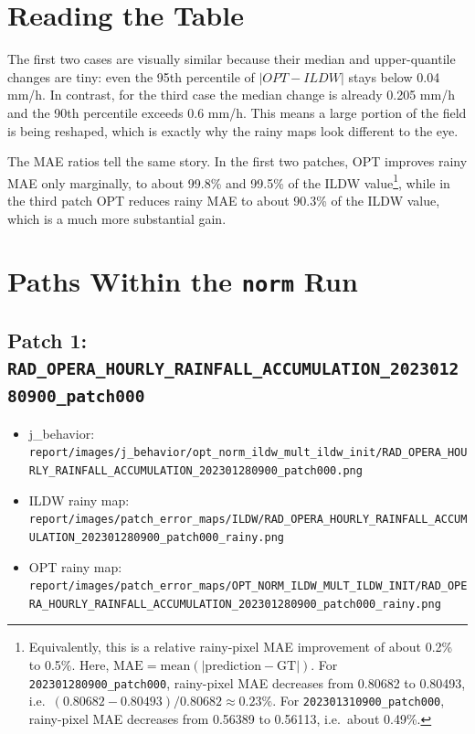 \documentclass[11pt]{article}
\begin{document}
\section*{Reading the Table}

The first two cases are visually similar because their median and upper-quantile changes are tiny: even the 95th percentile of $|OPT-ILDW|$ stays below 0.04 mm/h. In contrast, for the third case the median change is already 0.205 mm/h and the 90th percentile exceeds 0.6 mm/h. This means a large portion of the field is being reshaped, which is exactly why the rainy maps look different to the eye.

The MAE ratios tell the same story. In the first two patches, OPT improves rainy MAE only marginally, to about 99.8\% and 99.5\% of the ILDW value\footnote{Equivalently, this is a relative rainy-pixel MAE improvement of about 0.2\% to 0.5\%. Here, $\mathrm{MAE}=\mathrm{mean}(|\mathrm{prediction}-\mathrm{GT}|)$. For \texttt{202301280900\_patch000}, rainy-pixel MAE decreases from 0.80682 to 0.80493, i.e.\ $(0.80682-0.80493)/0.80682 \approx 0.23\%$. For \texttt{202301310900\_patch000}, rainy-pixel MAE decreases from 0.56389 to 0.56113, i.e.\ about 0.49\%.}, while in the third patch OPT reduces rainy MAE to about 90.3\% of the ILDW value, which is a much more substantial gain.

\section*{Paths Within the \texttt{norm} Run}

\subsection*{Patch 1: \texttt{RAD\_OPERA\_HOURLY\_RAINFALL\_ACCUMULATION\_202301280900\_patch000}}

\begin{itemize}[leftmargin=1.5em]
\item j\_behavior: \texttt{report/images/j\_behavior/opt\_norm\_ildw\_mult\_ildw\_init/RAD\_OPERA\_HOURLY\_RAINFALL\_ACCUMULATION\_202301280900\_patch000.png}
\item ILDW rainy map: \texttt{report/images/patch\_error\_maps/ILDW/RAD\_OPERA\_HOURLY\_RAINFALL\_ACCUMULATION\_202301280900\_patch000\_rainy.png}
\item OPT rainy map: \texttt{report/images/patch\_error\_maps/OPT\_NORM\_ILDW\_MULT\_ILDW\_INIT/RAD\_OPERA\_HOURLY\_RAINFALL\_ACCUMULATION\_202301280900\_patch000\_rainy.png}
\end{itemize}
\end{document}
